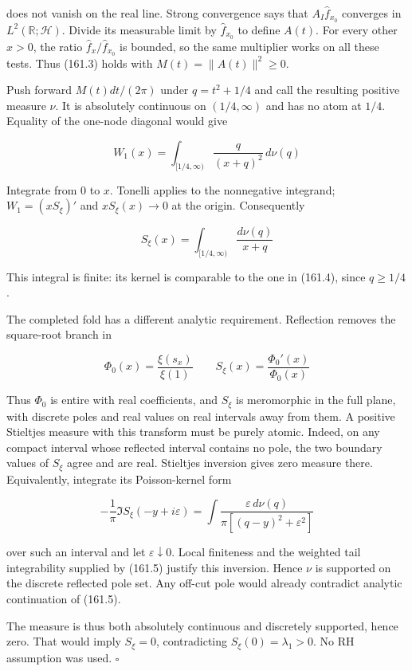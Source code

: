 \documentclass[
  11pt,
]{book}
\begin{document}
does not vanish on the real line. Strong convergence says that
\(A_I\widehat f_{x_0}\) converges in \(L^2(\mathbb R;\mathcal H)\).
Divide its measurable limit by \(\widehat f_{x_0}\) to define \(A(t)\).
For every other \(x>0\), the ratio \(\widehat f_x/\widehat f_{x_0}\) is
bounded, so the same multiplier works on all these tests. Thus (161.3)
holds with \(M(t)=\|A(t)\|^2\ge0\).

Push forward \(M(t)dt/(2\pi)\) under \(q=t^2+1/4\) and call the
resulting positive measure \(\nu\). It is absolutely continuous on
\((1/4,\infty)\) and has no atom at \(1/4\). Equality of the one-node
diagonal would give

\[
W_1(x)=\int_{[1/4,\infty)}\frac{q}{(x+q)^2}\,d\nu(q)
\tag{161.4}
\]

Integrate from \(0\) to \(x\). Tonelli applies to the nonnegative
integrand; \(W_1=(xS_\xi)'\) and \(xS_\xi(x)\to0\) at the origin.
Consequently

\[
\boxed{S_\xi(x)=\int_{[1/4,\infty)}\frac{d\nu(q)}{x+q}}
\tag{161.5}
\]

This integral is finite: its kernel is comparable to the one in (161.4),
since \(q\ge1/4\).

The completed fold has a different analytic requirement. Reflection
removes the square-root branch in

\[
\Phi_0(x)=\frac{\xi(s_x)}{\xi(1)}
\qquad S_\xi(x)=\frac{\Phi_0'(x)}{\Phi_0(x)}
\tag{161.6}
\]

Thus \(\Phi_0\) is entire with real coefficients, and \(S_\xi\) is
meromorphic in the full plane, with discrete poles and real values on
real intervals away from them. A positive Stieltjes measure with this
transform must be purely atomic. Indeed, on any compact interval whose
reflected interval contains no pole, the two boundary values of
\(S_\xi\) agree and are real. Stieltjes inversion gives zero measure
there. Equivalently, integrate its Poisson-kernel form

\[
-\frac1\pi\Im S_\xi(-y+i\varepsilon)
=\int\frac{\varepsilon\,d\nu(q)}
{\pi[(q-y)^2+\varepsilon^2]}
\tag{161.7}
\]

over such an interval and let \(\varepsilon\downarrow0\). Local
finiteness and the weighted tail integrability supplied by (161.5)
justify this inversion. Hence \(\nu\) is supported on the discrete
reflected pole set. Any off-cut pole would already contradict analytic
continuation of (161.5).

The measure is thus both absolutely continuous and discretely supported,
hence zero. That would imply \(S_\xi=0\), contradicting
\(S_\xi(0)=\lambda_1>0\). No RH assumption was used. \(\square\)
\end{document}
